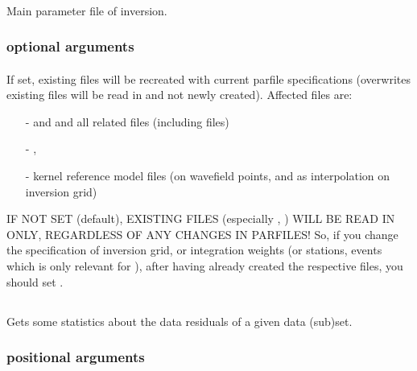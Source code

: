 \paragraph{}
Main parameter file of inversion.
\subsubsection{optional arguments}
\paragraph{}
If set, existing files will be recreated with current parfile specifications (overwrites existing files will be read in and not newly created). Affected files are:
\begin{itemize}
\item[-] and  and all related  files (including  files)
\item[-], 
\item[-]kernel reference model files (on wavefield points, and as interpolation on inversion grid)
\end{itemize}
IF NOT SET (default), EXISTING FILES (especially , ) WILL BE READ IN ONLY, REGARDLESS OF ANY CHANGES IN PARFILES! So, if you change the specification of inversion grid, or integration weights (or stations, events which is only relevant for  ), after having already created the respective files, you should set .
%
%
\subsection{} \label{programs_scripts,sec:bin_prog,sec:invest_data_residuals}
Gets some statistics about the data residuals of a given data (sub)set.
\subsubsection{positional arguments}
